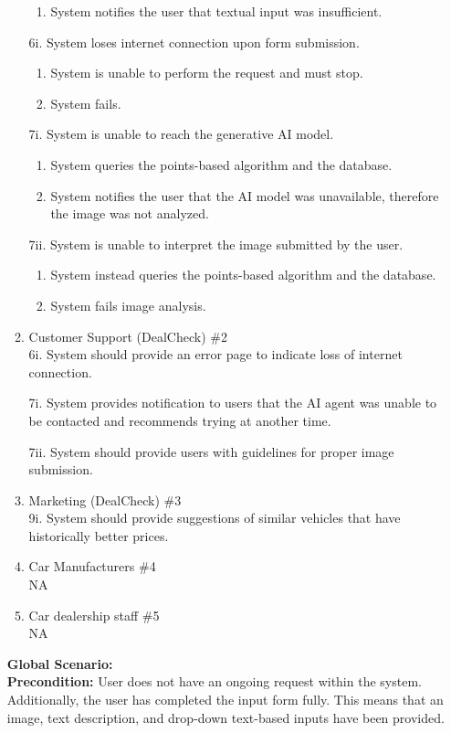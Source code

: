\documentclass[]{article}
\begin{document}
\begin{enumerate}[{\bf {BE}1.}]
\begin{enumerate}[{\bf VP1.}]
\begin{enumerate}[{5i}.1]
			\item System notifies the user that textual input was insufficient.
		\end{enumerate}
		6i. System loses internet connection upon form submission.
		\begin{enumerate}[{6i}.1]
			\item System is unable to perform the request and must stop.
			\item System fails.
		\end{enumerate}
		7i. System is unable to reach the generative AI model.
		\begin{enumerate}[{7i}.1]
			\item System queries the points-based algorithm and the database.
			\item System notifies the user that the AI model was unavailable, therefore the image was not analyzed.
		\end{enumerate}
		7ii. System is unable to interpret the image submitted by the user.
		\begin{enumerate}[{7ii}.1]
			\item System instead queries the points-based algorithm and the database.
			\item System fails image analysis.
		\end{enumerate}
		\item Customer Support (DealCheck) \#2 \\
			6i. System should provide an error page to indicate loss of internet connection.

			7i. System provides notification to users that the AI agent was unable to be contacted and recommends trying at another time.
			
			7ii. System should provide users with guidelines for proper image submission.
		\item Marketing (DealCheck) \#3 \\
			9i. System should provide suggestions of similar vehicles that have historically better prices.
		\item Car Manufacturers \#4 \\
			NA
		\item Car dealership staff \#5 \\
			NA
	\end{enumerate}
	{\bf Global Scenario:}\\
	{\bf Precondition:} User does not have an ongoing request within the system. Additionally, 
	the user has completed the input form fully. This means that an image, 
	text description, and drop-down text-based inputs have been provided.


\end{enumerate}
\end{document}

